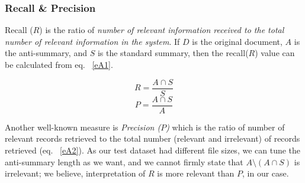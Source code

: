 \documentclass[a4paper]{report}
\def\firstcircle{(0,0) circle (1.3cm)}
\def\secondcircle{(1,1) circle (1 cm)}
\def\Urectangle{(-3,-2) rectangle(3,2)}
\begin{document}
\subsubsection{Recall \& Precision}
Recall ($R$) is the ratio of \emph{number of relevant information received to the total number of relevant information in the system}. If $D$ is the original document, $A$ is the anti-summary, and $S$ is the standard summary, then the recall($R$) value can be calculated from eq. ~\ref{eA1}.
 \vspace{-0.1in}
\begin{center}  
 \begin{minipage}{0.4\textwidth}
\end{minipage}%
\begin{minipage}{0.4\textwidth}
\begin{equation}
\label{eA1}
R =  \frac{A \cap S}{S}
\end{equation}
\begin{equation}\label{eA2}
P =  \frac{A \cap S}{A}
\end{equation}
\end{minipage}
\end{center}
 \vspace{-0.1in}
\par Another well-known measure is \emph{Precision ($P$)} which is the ratio of {number of relevant records retrieved} to the total number (relevant and irrelevant) of records retrieved (eq. ~\ref{eA2}). 
As our test dataset had different file sizes, we can tune the anti-summary length as we want, and we cannot firmly state that $A \setminus (A\cap S)$ is irrelevant; we believe, interpretation of $R$ is more relevant than $P$, in our case.
\end{document}
